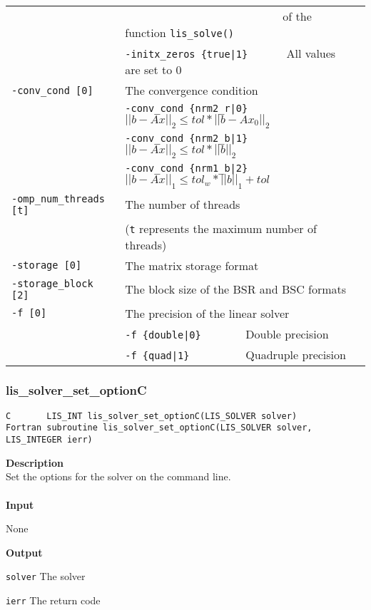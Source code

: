 \documentclass[a4paper]{article}
\newcommand{\namelistlabel}[1]{\mbox{#1}\hfill}
\newenvironment{namelist}[1]{%
\begin{list}{}
  {\let\makelabel\namelistlabel
  \settowidth{\labelwidth}{#1}
  \setlength{\leftmargin}{1.1\labelwidth}}
  }{%
\end{list}}
\begin{document}
\begin{minipage}[t]{\textwidth}
\begin{center}
\begin{tabular}{l|ll}
                       & \verb=                           =  of the function \verb=lis_solve()= \\
                       & \verb=-initx_zeros {true|1}      =  All values are set to $0$ \\
\verb=-conv_cond [0]= & The convergence condition  \\
                       & \verb=-conv_cond {nrm2_r|0}     =  $||b-Ax||_2 \le tol * ||b-Ax_0||_2$ \\
                       & \verb=-conv_cond {nrm2_b|1}     =  $||b-Ax||_2 \le tol * ||b||_2$ \\
                       & \verb=-conv_cond {nrm1_b|2}     =  $||b-Ax||_1 \le tol_w * ||b||_1 + tol$\\
\verb=-omp_num_threads [t]= & The number of threads        \\ 
                            & (\verb=t= represents the maximum number of
 threads) \\
\verb=-storage [0]=    & The matrix storage format \\
\verb=-storage_block [2]=& The block size of the BSR and BSC formats\\ 
\verb=-f [0]=          & The precision of the linear solver\\
                       & \verb=-f {double|0}       =  Double precision \\ 
                       & \verb=-f {quad|1}         =  Quadruple precision \\
\hline         
\end{tabular}
\end{center}
\end{minipage}

\newpage
\subsubsection{lis\_solver\_set\_optionC}
\begin{screen}
\verb|C       LIS_INT lis_solver_set_optionC(LIS_SOLVER solver)|\\
\verb|Fortran subroutine lis_solver_set_optionC(LIS_SOLVER solver, LIS_INTEGER ierr)|
\end{screen}
{\bf Description}\\
\indent
Set the options for the solver on the command line.
\\ \\
\noindent
{\bf Input}
\begin{namelist}{XXXXXXXXXXXXXXXXXXXX}
\item[None]
\end{namelist}
{\bf Output}
\begin{namelist}{XXXXXXXXXXXXXXXXXXXX}
\item[\tt solver] The solver
\item[\tt ierr] The return code
\end{namelist}
\end{document}

